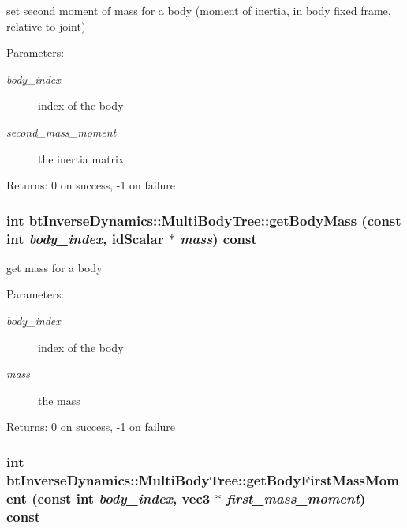set second moment of mass for a body (moment of inertia, in body fixed frame, relative to joint) \begin{Desc}
\item[Parameters:]
\begin{description}
\item[{\em body\_\-index}]index of the body \item[{\em second\_\-mass\_\-moment}]the inertia matrix \end{description}
\end{Desc}
\begin{Desc}
\item[Returns:]0 on success, -1 on failure \end{Desc}
\hypertarget{classbt_inverse_dynamics_1_1_multi_body_tree_ca41d87e7d3717d7d621eb20ce968b23}{
\subsubsection[getBodyMass]{\setlength{\rightskip}{0pt plus 5cm}int btInverseDynamics::MultiBodyTree::getBodyMass (const int {\em body\_\-index}, \/  idScalar $\ast$ {\em mass}) const}}
\label{classbt_inverse_dynamics_1_1_multi_body_tree_ca41d87e7d3717d7d621eb20ce968b23}


get mass for a body \begin{Desc}
\item[Parameters:]
\begin{description}
\item[{\em body\_\-index}]index of the body \item[{\em mass}]the mass \end{description}
\end{Desc}
\begin{Desc}
\item[Returns:]0 on success, -1 on failure \end{Desc}
\hypertarget{classbt_inverse_dynamics_1_1_multi_body_tree_65cf073d371fb6c028649964d21fedce}{
\subsubsection[getBodyFirstMassMoment]{\setlength{\rightskip}{0pt plus 5cm}int btInverseDynamics::MultiBodyTree::getBodyFirstMassMoment (const int {\em body\_\-index}, \/  {\bf vec3} $\ast$ {\em first\_\-mass\_\-moment}) const}}
\label{classbt_inverse_dynamics_1_1_multi_body_tree_65cf073d371fb6c028649964d21fedce}


